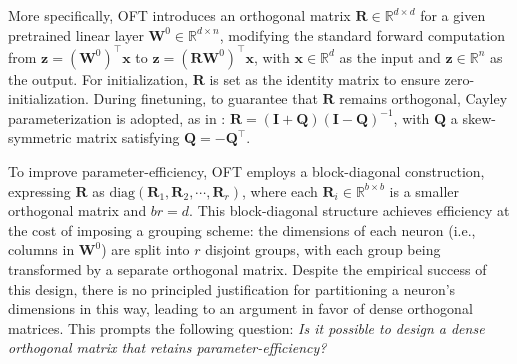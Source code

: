 More specifically, OFT introduces an orthogonal matrix $\bm{R}\in\mathbb{R}^{d\times d}$ for a given pretrained linear layer $\bm{W}^0\in\mathbb{R}^{d\times n}$, modifying the standard forward computation from $\bm{z} = (\bm{W}^0)^\top\bm{x}$ to $\bm{z} = (\bm{R}\bm{W}^0)^\top\bm{x}$, with $\bm{x} \in \mathbb{R}^{d}$ as the input and $\bm{z} \in \mathbb{R}^{n}$ as the output. For initialization, $\bm{R}$ is set as the identity matrix to ensure zero-initialization. During finetuning, to guarantee that $\bm{R}$ remains orthogonal, Cayley parameterization is adopted, as in \cite{qiu2023controlling,liu2021orthogonal}: $\bm{R} = (\bm{I}+\bm{Q})(\bm{I}-\bm{Q})^{-1}$, with $\bm{Q}$ a skew-symmetric matrix satisfying $\bm{Q} = -\bm{Q}^\top$.

To improve parameter-efficiency, OFT employs a block-diagonal construction, expressing $\bm{R}$ as $\text{diag}(\bm{R}_1, \bm{R}_2, \cdots, \bm{R}_r)$, where each $\bm{R}_i\in\mathbb{R}^{b\times b}$ is a smaller orthogonal matrix and $br=d$. This block-diagonal structure achieves efficiency at the cost of imposing a grouping scheme: the dimensions of each neuron (i.e., columns in $\bm{W}^0$) are split into $r$ disjoint groups, with each group being transformed by a separate orthogonal matrix. Despite the empirical success of this design, there is no principled justification for partitioning a neuron's dimensions in this way, leading to an argument in favor of dense orthogonal matrices. This prompts the following question: \emph{Is it possible to design a dense orthogonal matrix that retains parameter-efficiency?}

